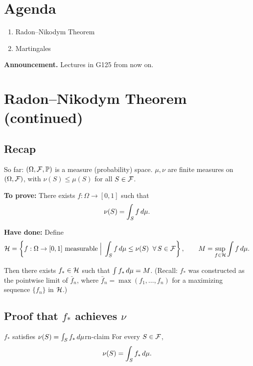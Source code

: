 
\section*{Agenda}
\begin{enumerate}
    \item Radon--Nikodym Theorem
    \item Martingales
\end{enumerate}

\noindent\textbf{Announcement.} Lectures in G125 from now on.

\section{Radon--Nikodym Theorem (continued)}

\subsection{Recap}

So far: $(\Omega, \mathcal{F}, \mathbb{P})$ is a measure (probability) space.
$\mu, \nu$ are finite measures on $(\Omega, \mathcal{F})$, with $\nu(S) \leq \mu(S)$ for all $S \in \mathcal{F}$.

\medskip
\noindent\textbf{To prove:} There exists $f : \Omega \to [0,1]$ such that
\[
    \nu(S) = \int_S f \,d\mu.
\]

\noindent\textbf{Have done:} Define
\[
    \mathcal{H} = \left\{ f : \Omega \to [0,1] \text{ measurable} \;\Big|\; \int_S f \,d\mu \leq \nu(S) \;\; \forall\, S \in \mathcal{F} \right\}, \qquad
    M = \sup_{f \in \mathcal{H}} \int f \,d\mu.
\]

Then there exists $f_* \in \mathcal{H}$ such that $\int f_* \,d\mu = M$.
(Recall: $f_*$ was constructed as the pointwise limit of $\bar{f}_n$, where $\bar{f}_n = \max(f_1, \ldots, f_n)$ for a maximizing sequence $\{f_n\}$ in $\mathcal{H}$.)

\subsection{Proof that \texorpdfstring{$f_*$}{f*} achieves \texorpdfstring{$\nu$}{nu}}

\begin{claim}{$f_*$ satisfies $\nu(S) = \int_S f_* \,d\mu$}{rn-claim}
    For every $S \in \mathcal{F}$,
    \[
        \nu(S) = \int_S f_* \,d\mu.
    \]
\end{claim}

